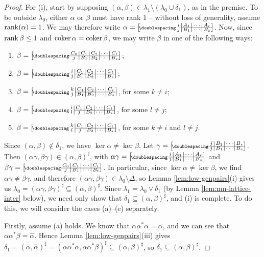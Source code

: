 \begin{lemma}
\begin{proof}
    For (i), start by supposing
    $(\alpha, \beta) \in \lambda_1 \setminus (\lambda_0 \cup \delta_1)$, as in
    the premise.  To be outside $\lambda_0$, either $\alpha$ or $\beta$ must
    have rank $1$ -- without loss of generality, assume $\operatorname{rank}(\alpha)=1$.  We
    may therefore write
    $\alpha=\bipart{c|c|c|c}{2-4}{i&A_1&\cdots&A_r}{j&B_1&\cdots&B_s}$.  Now,
    since $\operatorname{rank}\beta \leq 1$ and $\operatorname{coker}\alpha = \operatorname{coker}\beta$, we may write
    $\beta$ in one of the following ways:
    \begin{enumerate}[\rm(a)]
    \item $\beta = \bipart{c|c|c|c|c}{1-5}
      {C_0 & C_1 & C_2 & \cdots & C_t}{j & B_1 & B_2 & \cdots & B_s}$;
    \item $\beta = \bipart{c|c|c|c|c}{2-5}
      {i & C_1 & C_2 & \cdots & C_t}{j & B_1 & B_2 & \cdots & B_s}$;
    \item $\beta = \bipart{c|c|c|c|c}{2-5}
      {k & C_1 & C_2 & \cdots & C_t}{j & B_1 & B_2 & \cdots & B_s}$,
      for some $k \neq i$;
    \item $\beta = \bipart{c|c|c|c|c}{2-5}
      {i & C_1 & C_2 & \cdots & C_t}{l & j & B_2 & \cdots & B_s}$,
      for some $l \neq j$;
    \item $\beta = \bipart{c|c|c|c|c}{2-5}
      {k & C_1 & C_2 & \cdots & C_t}{l & j & B_2 & \cdots & B_s}$,
      for some $k \neq i$ and $l \neq j$.
    \end{enumerate}
    Since $(\alpha,\beta) \notin \delta_1$, we have
    $\ker\alpha \neq \ker\beta$.  Let
    $\gamma = \bipart{c|c|c|c}{1-4}
    {j & B_1 & \cdots & B_s}{j & B_1 & \cdots & B_s}$.  Then
    $(\alpha\gamma, \beta\gamma) \in (\alpha,\beta)^\sharp$, with
    $\alpha\gamma = \bipart{c|c|c|c}{1-4}
    {i & A_1 & \cdots & A_r}{j & B_1 & \cdots & B_s}$ and
    $\beta\gamma = \bipart{c|c|c|c}{1-4}
    {C_0 & C_1 & \cdots & C_t}{j & B_1 & \cdots & B_t}$.  In particular,
    since $\ker\alpha \neq \ker\beta$, we find $\alpha\gamma \neq \beta\gamma$,
    and therefore $(\alpha\gamma, \beta\gamma) \in \lambda_0 \setminus \Delta$,
    so Lemma \ref{lem:low-genpairs}(i) gives us
    $\lambda_0=(\alpha\gamma, \beta\gamma)^\sharp
    \subseteq (\alpha, \beta)^\sharp$.
    Since $\lambda_1 = \lambda_0 \vee \delta_1$ (by Lemma
    \ref{lem:mn-lattice-inter} below), we need only show that $\delta_1
    \subseteq (\alpha,\beta)^\sharp$, and (i) is complete.
    To do this, we will consider the cases (a)--(e) separately.

    Firstly, assume (a) holds.  We know that $\alpha \alpha^* \alpha = \alpha$,
    and we can see that $\alpha\alpha^*\beta = \widehat\alpha$.  Hence Lemma
    \ref{lem:low-genpairs}(iii) gives
    $\delta_1 = (\alpha, \widehat\alpha)^\sharp = (\alpha\alpha^*\alpha,
    \alpha\alpha^*\beta)^\sharp \subseteq (\alpha,\beta)^\sharp$, so
    $\delta_1 \subseteq (\alpha, \beta)^\sharp$.


\end{proof}
\end{lemma}
